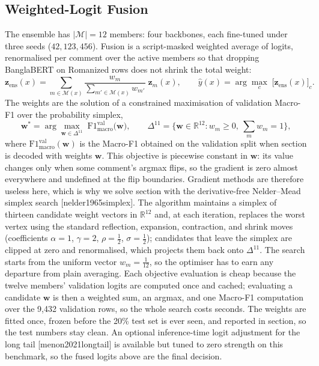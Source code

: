 \documentclass[11pt,a4paper]{article}
\def\citep#1{[#1]}%
\def\cref#1{section}%
\begin{document}
\subsection{Weighted-Logit Fusion}
\label{sec:fusion}

The ensemble has $|\mathcal{M}| = 12$ members: four backbones, each fine-tuned under three seeds ($42, 123, 456$). Fusion is a script-masked weighted average of logits, renormalised per comment over the active members so that dropping BanglaBERT on Romanized rows does not shrink the total weight:
\begin{equation}
\mathbf{z}_{\mathrm{ens}}(x) = \sum_{m \in \mathcal{M}(x)} \frac{w_m}{\sum_{m' \in \mathcal{M}(x)} w_{m'}}\; \mathbf{z}_m(x),
\qquad
\hat{y}(x) = \arg\max_{c}\; \big[\mathbf{z}_{\mathrm{ens}}(x)\big]_c.
\label{eq:fusion}
\end{equation}
The weights are the solution of a constrained maximisation of validation Macro-F1 over the probability simplex,
\begin{equation}
\mathbf{w}^{\ast} = \arg\max_{\mathbf{w} \in \Delta^{11}} \; \mathrm{F1}_{\mathrm{macro}}^{\mathrm{val}}\!\big(\mathbf{w}\big),
\qquad
\Delta^{11} = \Big\{ \mathbf{w} \in \mathbb{R}^{12} : w_m \ge 0,\ \textstyle\sum_{m} w_m = 1 \Big\},
\label{eq:weightopt}
\end{equation}
where $\mathrm{F1}_{\mathrm{macro}}^{\mathrm{val}}(\mathbf{w})$ is the Macro-F1 obtained on the validation split when \cref{eq:fusion} is decoded with weights $\mathbf{w}$. This objective is piecewise constant in $\mathbf{w}$: its value changes only when some comment's argmax flips, so the gradient is zero almost everywhere and undefined at the flip boundaries. Gradient methods are therefore useless here, which is why we solve \cref{eq:weightopt} with the derivative-free Nelder--Mead simplex search \citep{nelder1965simplex}. The algorithm maintains a simplex of thirteen candidate weight vectors in $\mathbb{R}^{12}$ and, at each iteration, replaces the worst vertex using the standard reflection, expansion, contraction, and shrink moves (coefficients $\alpha = 1$, $\gamma = 2$, $\rho = \tfrac{1}{2}$, $\sigma = \tfrac{1}{2}$); candidates that leave the simplex are clipped at zero and renormalised, which projects them back onto $\Delta^{11}$. The search starts from the uniform vector $w_m = \tfrac{1}{12}$, so the optimiser has to earn any departure from plain averaging. Each objective evaluation is cheap because the twelve members' validation logits are computed once and cached; evaluating a candidate $\mathbf{w}$ is then a weighted sum, an argmax, and one Macro-F1 computation over the 9{,}432 validation rows, so the whole search costs seconds. The weights are fitted once, frozen before the 20\% test set is ever seen, and reported in \cref{sec:ensemble-results}, so the test numbers stay clean. An optional inference-time logit adjustment for the long tail \citep{menon2021longtail} is available but tuned to zero strength on this benchmark, so the fused logits above are the final decision.
\end{document}
